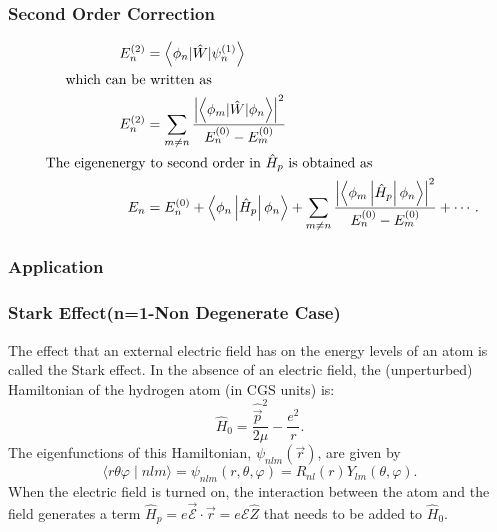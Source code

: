 \subsubsection{Second Order Correction}
\begin{align*}
E_{n}^{(2)}&=\left\langle\phi_{n}|\hat{W}| \psi_{n}^{(1)}\right\rangle\\
\text{which can  be}&\text{ written as}\\
E_{n}^{(2)}&=\sum_{m \neq n} \frac{\left|\left\langle\phi_{m}|\hat{W}| \phi_{n}\right\rangle\right|^{2}}{E_{n}^{(0)}-E_{m}^{(0)}}\\
\text{ The eigenenergy}&\text{ to second order in $ \hat{H}_{p}$ is obtained as }\\
E_{n}&=E_{n}^{(0)}+\left\langle\phi_{n}\left|\hat{H}_{p}\right| \phi_{n}\right\rangle+\sum_{m \neq n} \frac{\left|\left\langle\phi_{m}\left|\hat{H}_{p}\right| \phi_{n}\right\rangle\right|^{2}}{E_{n}^{(0)}-E_{m}^{(0)}}+\cdots .
\end{align*}






\subsubsection{Application}
\subsubsection{Stark Effect(n=1-Non Degenerate Case)}

 The effect that an external electric field has on the energy levels of an atom is called the Stark effect. In the absence of an electric field, the (unperturbed) Hamiltonian of the hydrogen atom (in CGS units) is:
$$
\hat{H}_{0}=\frac{\hat{\vec{p}}^{2}}{2 \mu}-\frac{e^{2}}{r} .
$$
The eigenfunctions of this Hamiltonian, $\psi_{n l m}(\vec{r})$, are given by
$$
\langle r \theta \varphi \mid n l m\rangle=\psi_{n l m}(r, \theta, \varphi)=R_{n l}(r) Y_{l m}(\theta, \varphi) .
$$
When the electric field is turned on, the interaction between the atom and the field generates a term $\hat{H}_{p}=e \overrightarrow{\mathcal{E}} \cdot \vec{r}=e \mathcal{E} \hat{Z}$ that needs to be added to $\hat{H}_{0}$.

